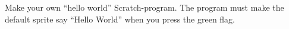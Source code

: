 Make your own ``hello world'' Scratch-program. The program must make the default sprite say ``Hello World'' when you press the green flag.